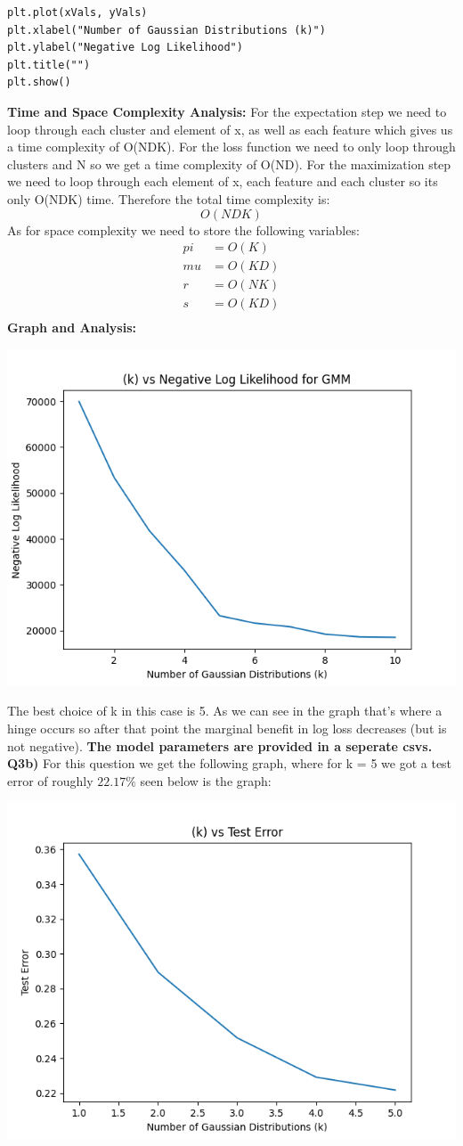\documentclass{article}
\begin{document}
\begin{titlepage}
\begin{lstlisting}
plt.plot(xVals, yVals)
plt.xlabel("Number of Gaussian Distributions (k)")
plt.ylabel("Negative Log Likelihood")
plt.title("")
plt.show()
\end{lstlisting}
\newpage
\textbf{Time and Space Complexity Analysis: } For the expectation step we need to loop through each cluster and element of x, as well as each feature which gives us a time complexity of O(NDK). For the loss function we need to only loop through clusters and N so we get a time complexity of O(ND). For the maximization step we need to loop through each element of x, each feature and each cluster so its only O(NDK) time. Therefore the total time complexity is:
\[ O(NDK) \]
As for space complexity we need to store the following variables:
\begin{align*}
pi &= O(K) \\
mu &= O(KD) \\
r &= O(NK) \\
s &= O(KD) \\
\end{align*}
\textbf{Graph and Analysis: } 
\begin{center}
 \includegraphics[width=.7\linewidth]{q3aplot.png} \\
 \end{center}
The best choice of k in this case is 5. As we can see in the graph that's where a hinge occurs so after that point the marginal benefit in log loss decreases (but is not negative). \textbf{The model parameters are provided in a seperate csvs.}
\newpage
\textbf{Q3b)} For this question we get the following graph, where for k = 5 we got a test error of roughly $22.17\%$ seen below is the graph:
\begin{center}
 \includegraphics[width=.7\linewidth]{q3b.png} \\

\end{center}
\end{titlepage}
\end{document}
